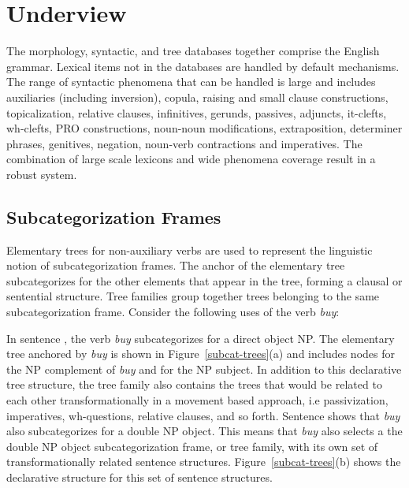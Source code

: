 \section{Underview}

The morphology, syntactic, and tree databases together comprise the English
grammar.  Lexical items not in the databases are handled by default mechanisms.
The range of syntactic phenomena that can be handled is large and includes
auxiliaries (including inversion), copula, raising and small clause
constructions, topicalization, relative clauses, infinitives, gerunds,
passives, adjuncts, it-clefts, wh-clefts, PRO constructions, noun-noun
modifications, extraposition, determiner phrases, genitives, negation,
noun-verb contractions and imperatives.  The combination of large scale
lexicons and wide phenomena coverage result in a robust system.


\subsection{Subcategorization Frames}
\label{subcat-frames}

Elementary trees for non-auxiliary verbs are used to represent the linguistic
notion of subcategorization frames.  The anchor of the elementary tree
subcategorizes for the other elements that appear in the tree, forming a
clausal or sentential structure.  Tree families group together trees belonging
to the same subcategorization frame.  Consider the following uses of the verb
{\it buy}:


In sentence , the verb {\it buy} subcategorizes for a direct object NP.
The elementary tree anchored by {\it buy} is shown in
Figure~\ref{subcat-trees}(a) and includes nodes for the NP complement of {\it
buy} and for the NP subject.  In addition to this declarative tree structure,
the tree family also contains the trees that would be related to each other
transformationally in a movement based approach, i.e passivization,
imperatives, wh-questions, relative clauses, and so forth.  Sentence 
shows that {\it buy} also subcategorizes for a double NP object.  This means
that {\it buy} also selects a the double NP object subcategorization frame, or
tree family, with its own set of transformationally related sentence
structures.  Figure~\ref{subcat-trees}(b) shows the declarative structure for
this set of sentence structures.

